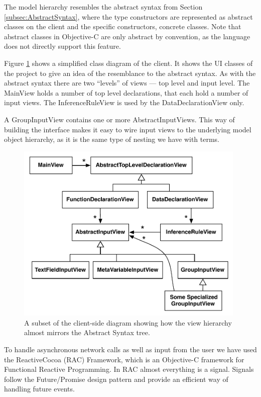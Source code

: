 The model hierarchy resembles the abstract syntax from Section \ref{subsec:AbstractSyntax},
where the type constructors are represented as abstract classes on the client
and the specific constructors, concrete classes. Note that abstract classes in
Objective-C are only abstract by convention, as the language does not directly
support this feature.

Figure \ref{fig:clientViewArchitecture} shows a simplified class diagram of the
client. It shows the UI classes of the project to give an idea of
the resemblance to the abstract syntax. As with the abstract syntax there are
two ``levels'' of views --- top level and input level. The MainView holds a
number of top level declarations, that each hold a number of input views. The
InferenceRuleView is used by the DataDeclarationView only.

A GroupInputView contains one or more AbstractInputViews. This way of building
the interface makes it easy to wire input views to the underlying model object
hierarchy, as it is the same type of nesting we have with terms. 

\begin{figure}
	\centering
		\includegraphics[width=110mm]{diagrams/client_side_class_diagram.pdf}
	\caption{A subset of the client-side diagram showing how the view hierarchy
	almost mirrors the Abstract Syntax tree.}
	\label{fig:clientViewArchitecture}
\end{figure}

To handle asynchronous network calls as well as input from the user we have
used the ReactiveCocoa (RAC) Framework, which is an Objective-C framework for
Functional Reactive Programming. In RAC almost everything is a
signal. Signals follow the Future/Promise design pattern and provide an
efficient way of handling future events.












